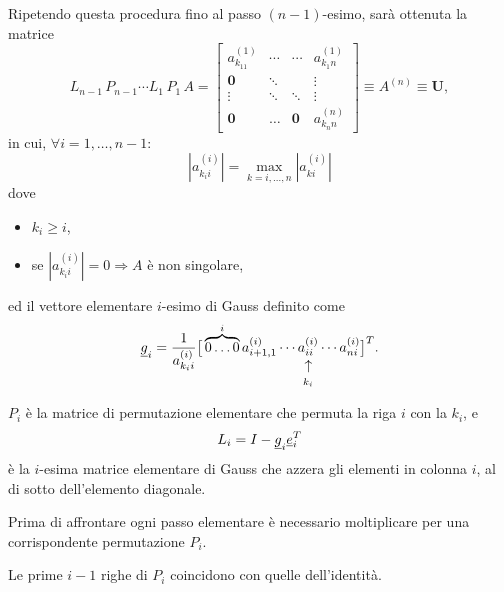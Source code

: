Ripetendo questa procedura fino al passo $(n-1)$-esimo, sarà ottenuta la matrice
\begin{equation}\label{eq:Uperm}
    L_{n-1}\, P_{n-1} \cdots L_1\, P_1\, A = 
    \begin{bmatrix}
        a_{k_11}^{(1)} & \cdots & \cdots & a_{k_1n}^{(1)}\\
        \boldsymbol 0 & \ddots & & \vdots\\
        \boldsymbol\vdots & \boldsymbol\ddots &\ddots &\vdots\\
        \boldsymbol 0 & \boldsymbol\hdots & \boldsymbol 0 & a_{k_nn}^{(n)}
    \end{bmatrix}\equiv A^{(n)}\equiv \boldsymbol U,
\end{equation}
in cui, $\forall i=1,\hdots, n-1:$
\begin{equation*}
    \left|a_{k_ii}^{(i)}\right|=\underset{k=i,\hdots, n}{\max}\left|a_{ki}^{(i)}\right|
\end{equation*}
dove
\begin{itemize}
    \item $k_i\geq i$,
    \item se $\left|a_{k_i i}^{(i)}\right|=0\Rightarrow A$ è non \gls{singolare},
\end{itemize}
ed il vettore elementare $i$-esimo di Gauss definito come
\begin{equation*}
    \uline g_i=\frac{1}{a_{k_ii}^{(i)}}\big[\overbrace{0\hdots 0}^{i}a_{i+1, 1}^{(i)}\cdots \vrightarrowup{a_{ii}^{(i)}}{k_i}\cdots a_{ni}^{(i)}\big]^T.
\end{equation*}

$P_i$ è la matrice di permutazione elementare che permuta la riga $i$ con la $k_i$, e 
\begin{equation}
    L_i=I-\uline g_i\uline e_i^T
\end{equation}
è la $i$-esima matrice elementare di Gauss che azzera gli elementi in colonna $i$, al di sotto dell'elemento diagonale.

Prima di affrontare ogni passo elementare è necessario moltiplicare per una corrispondente permutazione $P_i.$
\begin{remark}
    Le prime $i-1$ righe di $P_i$ coincidono con quelle dell'identità.
\end{remark}

